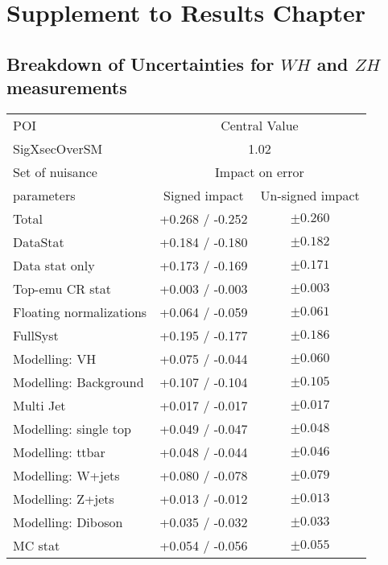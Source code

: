\chapter{Supplement to Results Chapter}
\label{app:results-supp}

\section{Breakdown of Uncertainties for $W\! H$ and $Z\! H$ measurements}
\label{app:wh-zh-breakdown}

\begin{table}[h]
\centering
\begin{tabular}{|l|c|c|}
\hline\hline
POI & \multicolumn{2}{c|}{Central Value} \\
SigXsecOverSM & \multicolumn{2}{c|}{1.02} \\ 
\hline \hline
Set of nuisance & \multicolumn{2}{c|}{Impact on error}  \\\hline
 parameters     & Signed impact & Un-signed impact  \\\hline\hline
Total                   & +0.268 / -0.252 & $ \pm 0.260 $ \\\hline
DataStat                 & +0.184 / -0.180 & $ \pm 0.182 $ \\\hline
Data stat only           & +0.173 / -0.169 & $ \pm 0.171 $ \\
Top-emu CR stat          & +0.003 / -0.003 & $ \pm 0.003 $ \\
Floating normalizations  & +0.064 / -0.059 & $ \pm 0.061 $ \\\hline\hline
FullSyst                & +0.195 / -0.177 & $ \pm 0.186 $ \\\hline
Modelling: VH            & +0.075 / -0.044 & $ \pm 0.060 $ \\\hline
Modelling: Background    & +0.107 / -0.104 & $ \pm 0.105 $ \\\hline
Multi Jet                & +0.017 / -0.017 & $ \pm 0.017 $ \\
Modelling: single top    & +0.049 / -0.047 & $ \pm 0.048 $ \\
Modelling: ttbar         & +0.048 / -0.044 & $ \pm 0.046 $ \\
Modelling: W+jets        & +0.080 / -0.078 & $ \pm 0.079 $ \\
Modelling: Z+jets        & +0.013 / -0.012 & $ \pm 0.013 $ \\
Modelling: Diboson       & +0.035 / -0.032 & $ \pm 0.033 $ \\
MC stat                  & +0.054 / -0.056 & $ \pm 0.055 $ \\\hline\hline

\end{tabular}
\end{table}
